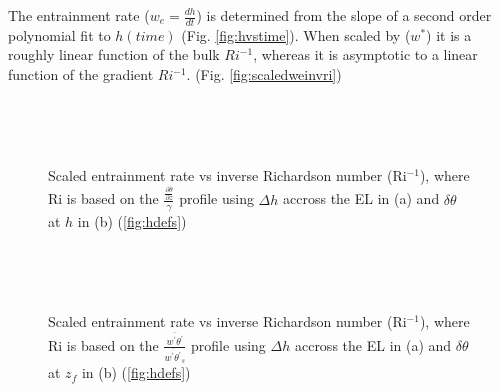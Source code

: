 The entrainment rate ($w_{e}= \frac{dh}{dt}$) is determined from the slope of a second order polynomial fit to $h(time)$ (Fig. \ref{fig:hvstime}).  When scaled by ($w^{*}$) it is a roughly linear function 
of the bulk $Ri^{-1}$, whereas it is asymptotic to a linear function of the gradient $Ri^{-1}$. (Fig. \ref{fig:scaledweinvri})\\    

\begin{figure}[htbp]
\begin{minipage}[b]{0.5\linewidth}
        \\
        \end{minipage}             
\quad
\begin{minipage}[b]{0.5\linewidth}
        \\       
       \end{minipage}
        \caption{Scaled entrainment rate vs inverse Richardson number (\acs{Ri}$^{-1}$), where \acs{Ri} is based on the $\frac{\frac{\partial \overline{\theta}}{\partial z}}{\gamma}$ profile using $\Delta h$ accross the \acs{EL} in (a) and $\delta \theta$ at $h$ in (b) (\ref{fig:hdefs})}
        \label{fig:}
\end{figure}


\begin{figure}[htbp]
\begin{minipage}[b]{0.5\linewidth}
        \\
        \end{minipage}             
\quad
\begin{minipage}[b]{0.5\linewidth}
        \\
       
       \end{minipage}
        \caption{Scaled entrainment rate vs inverse Richardson number (\acs{Ri}$^{-1}$), where \acs{Ri} is based on the $\frac{\overline{w^{'}\theta^{'}}}{\overline{w^{'}\theta^{'}}_{s}}$
profile using $\Delta h$ accross the \acs{EL} in (a) and $\delta \theta$ at $z_{f}$ in (b) (\ref{fig:hdefs})}
        \label{fig:}
\end{figure}

\endinput

Any text after an \endinput is ignored.
You could put scraps here or things in progress.
